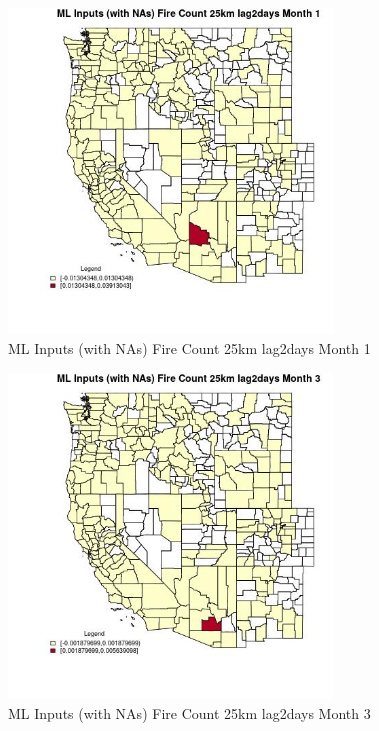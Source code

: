 \begin{figure} 
\centering  
\includegraphics[width=0.77\textwidth]{Code_Outputs/Report_ML_input_PM25_Step4_part_e_de_duplicated_aves_compiled_2019-05-21wNAs_CountyFire_Count_25km_lag2daysmedianMonth1.jpg} 
\caption{\label{fig:Report_ML_input_PM25_Step4_part_e_de_duplicated_aves_compiled_2019-05-21wNAsCountyFire_Count_25km_lag2daysmedianMonth1}ML Inputs (with NAs) Fire Count 25km lag2days Month 1} 
\end{figure} 
 

\begin{figure} 
\centering  
\includegraphics[width=0.77\textwidth]{Code_Outputs/Report_ML_input_PM25_Step4_part_e_de_duplicated_aves_compiled_2019-05-21wNAs_CountyFire_Count_25km_lag2daysmedianMonth3.jpg} 
\caption{\label{fig:Report_ML_input_PM25_Step4_part_e_de_duplicated_aves_compiled_2019-05-21wNAsCountyFire_Count_25km_lag2daysmedianMonth3}ML Inputs (with NAs) Fire Count 25km lag2days Month 3} 
\end{figure} 
 

